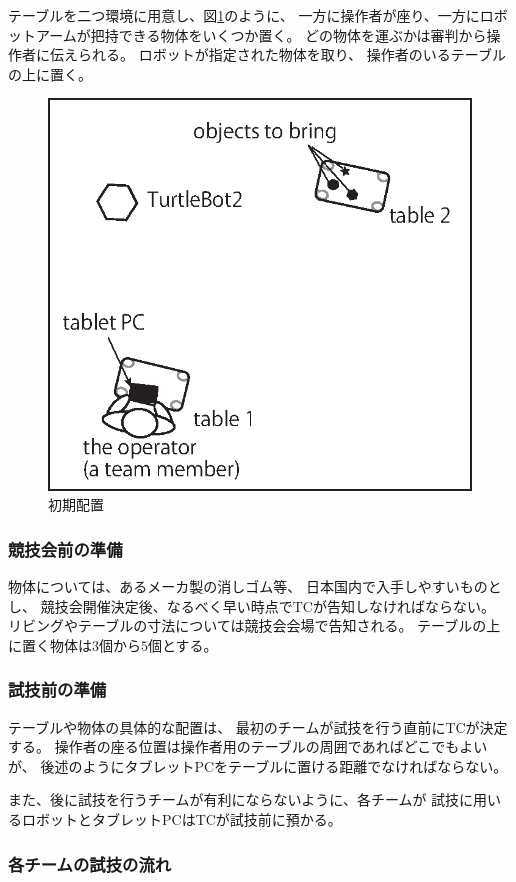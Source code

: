 \documentclass[a4j]{jarticle}
\begin{document}
テーブルを二つ環境に用意し、図\ref{fig:test1}のように、
一方に操作者が座り、一方にロボットアームが把持できる物体をいくつか置く。
どの物体を運ぶかは審判から操作者に伝えられる。
ロボットが指定された物体を取り、
操作者のいるテーブルの上に置く。


\begin{figure}[h]
	\begin{center}
		\includegraphics[width=0.4\linewidth]{./IMAGE/test1.eps}
		\caption{初期配置}
		\label{fig:test1}
	\end{center}
\end{figure}


\subsubsection{競技会前の準備}

物体については、あるメーカ製の消しゴム等、
日本国内で入手しやすいものとし、
競技会開催決定後、なるべく早い時点でTCが告知しなければならない。
リビングやテーブルの寸法については競技会会場で告知される。
テーブルの上に置く物体は$3$個から$5$個とする。

\subsubsection{試技前の準備}

テーブルや物体の具体的な配置は、
最初のチームが試技を行う直前にTCが決定する。
操作者の座る位置は操作者用のテーブルの周囲であればどこでもよいが、
後述のようにタブレットPCをテーブルに置ける距離でなければならない。

また、後に試技を行うチームが有利にならないように、各チームが
試技に用いるロボットとタブレットPCはTCが試技前に預かる。


\subsubsection{各チームの試技の流れ}
\end{document}
